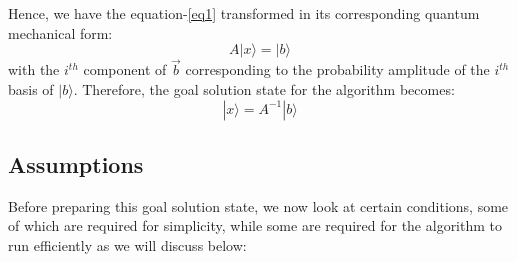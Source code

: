 \documentclass[12pt]{article}
\begin{document}
Hence, we have the equation-\ref{eq1} transformed in its corresponding quantum mechanical form: 
\begin{equation} \label{eq3}
    A |x\rangle = |b\rangle
\end{equation}
with the $i^{th}$ component of $\vec{b}$ corresponding to the probability amplitude of the $i^{th}$ basis of $|b\rangle$.
Therefore, the goal solution state for the algorithm becomes: 
\begin{equation} \label{eq4}
    |x\rangle = A^{-1}|b\rangle 
\end{equation}

\subsection{Assumptions}
Before preparing this goal solution state, we now look at certain conditions, some of which are required for simplicity, while some are required for the algorithm to run efficiently as we will discuss below: 
\end{document}
